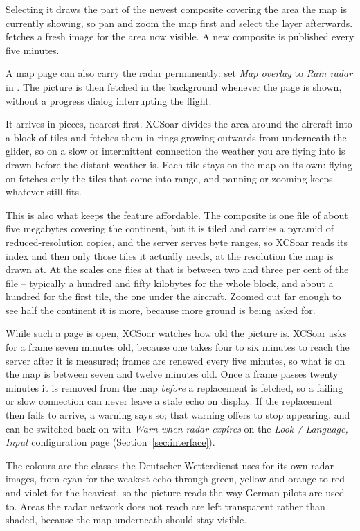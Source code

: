 Selecting it draws the part of the newest composite covering the area
the map is currently showing, so pan and zoom the map first and select
the layer afterwards.   fetches a fresh image for the
area now visible.  A new composite is published every five minutes.

A map page can also carry the radar permanently: set \emph{Map
overlay} to \emph{Rain radar} in
.  The picture is then fetched
in the background whenever the page is shown, without a progress
dialog interrupting the flight.

It arrives in pieces, nearest first.  XCSoar divides the area around
the aircraft into a block of tiles and fetches them in rings growing
outwards from underneath the glider, so on a slow or intermittent
connection the weather you are flying into is drawn before the
distant weather is.  Each tile stays on the map on its own: flying on
fetches only the tiles that come into range, and panning or zooming
keeps whatever still fits.

This is also what keeps the feature affordable.  The composite is one
file of about five megabytes covering the continent, but it is
tiled and carries a pyramid of reduced-resolution copies, and the
server serves byte ranges, so XCSoar reads its index and then only
those tiles it actually needs, at the resolution the map is drawn at.
At the scales one flies at that is between two and three per cent of
the file -- typically a hundred and fifty kilobytes for the whole
block, and about a hundred for the first tile, the one under the
aircraft.  Zoomed out far enough to see half the continent it is more,
because more ground is being asked for.

While such a page is open, XCSoar watches how old the picture is.
XCSoar asks for a frame seven minutes old, because one takes four to
six minutes to reach the server after it is measured; frames are
renewed every five minutes, so what is on the map is between seven and
twelve minutes old.  Once a frame passes twenty minutes it is removed
from the map \emph{before} a replacement is fetched, so a failing or
slow connection can never leave a stale echo on display.  If the
replacement then fails to arrive, a warning says so; that warning
offers to stop appearing, and can be switched back on with
\emph{Warn when radar expires} on the \emph{Look / Language, Input}
configuration page (Section~\ref{sec:interface}).

The colours are the classes the Deutscher Wetterdienst uses for its
own radar images, from cyan for the weakest echo through green,
yellow and orange to red and violet for the heaviest, so the picture
reads the way German pilots are used to.  Areas the radar network
does not reach are left transparent rather than shaded, because the
map underneath should stay visible.

